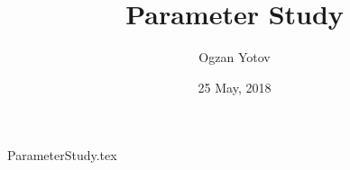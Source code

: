 \documentclass[10pt,a4paper]{article}
\title{Parameter Study }
\date{25 May, 2018}
\author{Ogzan Yotov}
\begin{document}
\maketitle

{ParameterStudy.tex}
\end{document}
